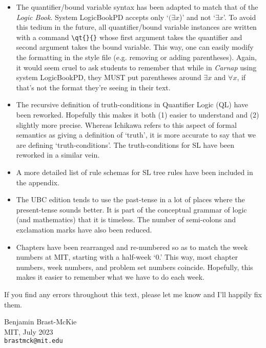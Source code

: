 \begin{itemize}
  \item The quantifier/bound variable syntax has been adapted to match that of the \textit{Logic Book}.
    System LogicBookPD accepts only `$(\exists x$)' and not `$\exists x$'.
    To avoid this tedium in the future, all quantifier/bound variable instances are written with a command \verb|\qt{}{}| whose first argument takes the quantifier and second argument takes the bound variable.
    This way, one can easily modify the formatting in the style file (e.g. removing or adding parentheses).
    Again, it would seem cruel to ask students to remember that while in \textit{Carnap} using system LogicBookPD, they MUST put parentheses around $\exists x$ and $\forall x$, if that's not the format they're seeing in their text.
  \item The recursive definition of truth-conditions in Quantifier Logic (QL) have been reworked.
    Hopefully this makes it both (1) easier to understand and (2) slightly more precise.
    Whereas Ichikawa refers to this aspect of formal semantics as giving a definition of `truth', it is more accurate to say that we are defining `truth-conditions'.
    The truth-conditions for SL have been reworked in a similar vein.
  \item A more detailed list of rule schemas for SL tree rules have been included in the appendix. 
  \item The UBC edition tends to use the past-tense in a lot of places where the present-tense sounds better.
    It is part of the conceptual grammar of logic (and mathematics) that it is timeless. 
    The number of semi-colons and exclamation marks have also been reduced.
  \item Chapters have been rearranged and re-numbered so as to match the week numbers at MIT, starting with a half-week `0.'
    This way, most chapter numbers, week numbers, and problem set numbers coincide.
    Hopefully, this makes it easier to remember what we have to do each week.
\end{itemize}

If you find any errors throughout this text, please let me know and I'll happily fix them.

\begin{flushright}
\textsf{Benjamin Brast-McKie} \\
\textsf{MIT, July 2023} \\
\texttt{brastmck@mit.edu}
\end{flushright}


\iffalse

